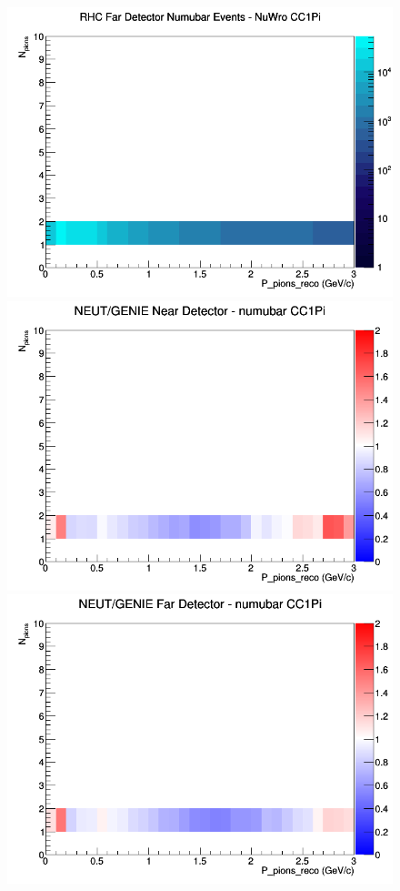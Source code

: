 \documentclass[12pt]{article}
\begin{document}
\begin{figure}[h]
\endminipage
{}
\includegraphics[width=\linewidth]{eff_N_P/GAr/pions/CC1Pi_RHC_FD_numubar_N_P_NuWro.png}
\endminipage
\newline
{}
\includegraphics[width=\linewidth]{eff_N_P/GAr/pions/ratios/CC1Pi_NEUT_GENIE_numubar_near_N_P.png}
\endminipage
{}
\includegraphics[width=\linewidth]{eff_N_P/GAr/pions/ratios/CC1Pi_NEUT_GENIE_numubar_far_N_P.png}

\end{figure}
\end{document}
